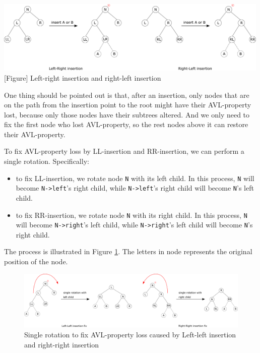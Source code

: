 \documentclass[12pt]{book}
\begin{document}
\begin{center}
\includegraphics[width=500px]{./img/AVL-LR-RL-insertion.pdf}
[Figure]{\label{fig:org6644503}
Left-right insertion and right-left insertion}
\end{center}

One thing should be pointed out is that, after an insertion, only nodes that are on the path from the insertion point to the root might have their AVL-property lost, because only those nodes have their subtrees altered. And we only need to fix the first node who lost AVL-property, so the rest nodes above it can restore their AVL-property.

To fix AVL-property loss by LL-insertion and RR-insertion, we can perform a single rotation. Specifically:
\begin{itemize}
\item to fix LL-insertion, we rotate node \texttt{N} with its left child. In this process, \texttt{N} will become \texttt{N->left}'s right child, while \texttt{N->left}'s right child will become \texttt{N}'s left child.
\item to fix RR-insertion, we rotate node \texttt{N} with its right child. In this process, \texttt{N} will become \texttt{N->right}'s left child, while \texttt{N->right}'s left child will become \texttt{N}'s right child.
\end{itemize}

The process is illustrated in Figure \ref{fig:orgc8cd2a1}. The letters in node represents the original position of the node.

\begin{figure}[htbp]
\centering
\includegraphics[width=500px]{./img/AVL-LL-RR-insertion-fix.pdf}
\caption[Figure]{\label{fig:orgc8cd2a1}
Single rotation to fix AVL-property loss caused by Left-left insertion and right-right insertion}
\end{figure}
\end{document}
